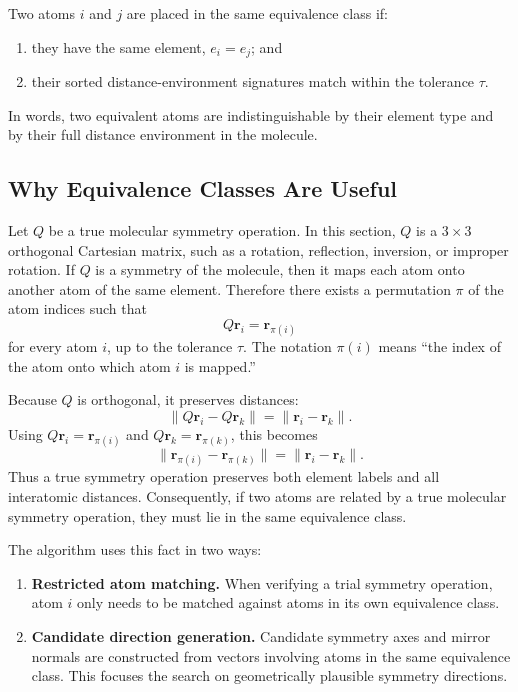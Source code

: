 \documentclass[11pt]{article}
\begin{document}
Two atoms \(i\) and \(j\) are placed in the same equivalence class if:
\begin{enumerate}[label=(\alph*)]
    \item they have the same element, \(e_i=e_j\); and
    \item their sorted distance-environment signatures match within the
    tolerance \(\tau\).
\end{enumerate}
In words, two equivalent atoms are indistinguishable by their element type and by
their full distance environment in the molecule.

\subsection{Why Equivalence Classes Are Useful}

Let \(Q\) be a true molecular symmetry operation.  In this section, \(Q\) is a
\(3\times 3\) orthogonal Cartesian matrix, such as a rotation, reflection,
inversion, or improper rotation.  If \(Q\) is a symmetry of the molecule, then it
maps each atom onto another atom of the same element.  Therefore there exists a
permutation \(\pi\) of the atom indices such that
\[
    Q\mathbf r_i = \mathbf r_{\pi(i)}
\]
for every atom \(i\), up to the tolerance \(\tau\).  The notation \(\pi(i)\)
means ``the index of the atom onto which atom \(i\) is mapped.''

Because \(Q\) is orthogonal, it preserves distances:
\[
    \lVert Q\mathbf r_i - Q\mathbf r_k\rVert
    =
    \lVert \mathbf r_i - \mathbf r_k\rVert .
\]
Using \(Q\mathbf r_i=\mathbf r_{\pi(i)}\) and
\(Q\mathbf r_k=\mathbf r_{\pi(k)}\), this becomes
\[
    \lVert \mathbf r_{\pi(i)} - \mathbf r_{\pi(k)}\rVert
    =
    \lVert \mathbf r_i - \mathbf r_k\rVert .
\]
Thus a true symmetry operation preserves both element labels and all
interatomic distances.  Consequently, if two atoms are related by a true
molecular symmetry operation, they must lie in the same equivalence class.

The algorithm uses this fact in two ways:
\begin{enumerate}[label=(\alph*)]
    \item \textbf{Restricted atom matching.}  When verifying a trial symmetry
    operation, atom \(i\) only needs to be matched against atoms in its own
    equivalence class.
    \item \textbf{Candidate direction generation.}  Candidate symmetry axes and
    mirror normals are constructed from vectors involving atoms in the same
    equivalence class.  This focuses the search on geometrically plausible
    symmetry directions.
\end{enumerate}
\end{document}
